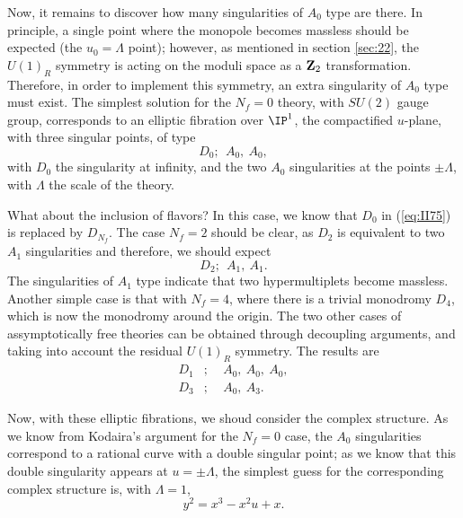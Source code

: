 Now, it
remains to discover how many singularities of $A_0$ type are there. In
principle, a single point where the monopole becomes massless
should be expected (the $u_0=\Lambda$ point); however, as
mentioned in section \ref{sec:22}, the $U(1)_R$ symmetry is
acting on the moduli space as a ${\bf Z}_2$ transformation.
Therefore, in order to implement this symmetry, an extra singularity of $A_0$
type must exist. The simplest solution for the $N_f=0$ theory,
with $SU(2)$ gauge group, corresponds to an elliptic fibration
over $\IP^1$, the compactified $u$-plane, with three singular
points, of type 
\begin{equation}
D_0; \: \: A_0, \: A_0,
\label{eq:II75}
\end{equation}
with $D_0$ the singularity at infinity, and the two $A_0$
singularities at the points $\pm \Lambda$, with $\Lambda$ the
scale of the theory. 
  
What about the inclusion of flavors? In
this case, we know that $D_0$ in (\ref{eq:II75}) is replaced by
$D_{N_f}$. The case $N_f=2$ should be clear, as $D_2$ is
equivalent to two $A_1$ singularities and therefore, we should expect
\begin{equation}
D_2; \: \: A_1, \: A_1.
\label{eq:II76}
\end{equation}
The singularities of $A_1$ type indicate that two hypermultiplets
become massless. Another simple case is that with $N_f=4$,
where there is a trivial monodromy $D_4$, which is now the
monodromy around the origin. The two other cases of
assymptotically free theories can be obtained through decoupling
arguments, and taking into account the residual $U(1)_R$ symmetry. 
The results are \cite{GMS}
\begin{eqnarray}
D_1 & ; & \: \: A_0, \: A_0, \: A_0, \nonumber \\
D_3 & ; & \: \: A_0, \: A_3.
\label{eq:II77}
\end{eqnarray}

Now, with these elliptic fibrations, we shoud consider the
complex structure. As we know from Kodaira's argument for the
$N_f=0$ case, the $A_0$ singularities correspond to a rational
curve with a double singular point; as we know that this double
singularity appears at $u=\pm \Lambda$, the simplest guess for
the corresponding complex structure is, with $\Lambda=1$,
\begin{equation}
y^2= x^3-x^2u+x.
\label{eq:282}
\end{equation}
  
